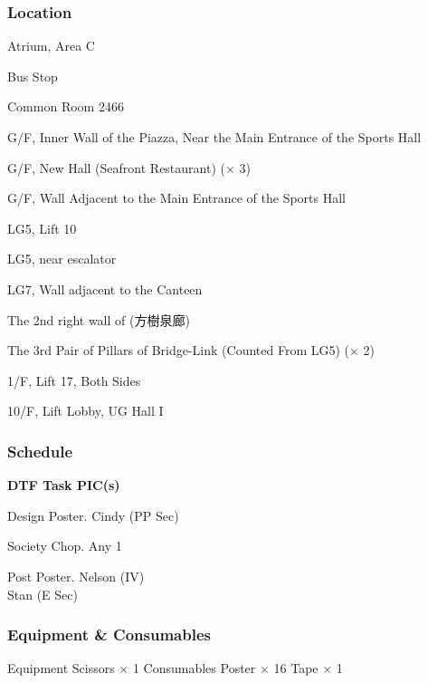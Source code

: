 \subsubsection{Location}
\startitemize
\item Atrium, Area C
\item Bus Stop
\item Common Room 2466
\item G/F, Inner Wall of the Piazza, Near the Main Entrance of the Sports Hall
\item G/F, New Hall (Seafront Restaurant) ($\times$ 3)
\item G/F, Wall Adjacent to the Main Entrance of the Sports Hall
\item LG5, Lift 10
\item LG5, near escalator
\item LG7, Wall adjacent to the Canteen
\item The 2nd right wall of  ({\switchtobodyfont[sourcehan]方樹泉廊})
\item The 3rd Pair of Pillars of Bridge-Link (Counted From LG5) ($\times$ 2)
\item 1/F, Lift 17, Both Sides
\item 10/F, Lift Lobby, UG Hall I
\stopitemize

\subsubsection{Schedule}

\setupTABLE[c][1][width=1.25in]
\setupTABLE[c][2][width=3.5in]
\setupTABLE[c][3][width=1.25in]
\bTABLE
\bTABLEhead

\bTR\bTH    \bf{DTF}
\eTH\bTH    \bf{Task}
\eTH\bTH    \bf{PIC(s)}
\eTH\eTR

\eTABLEhead
\bTABLEbody

\bTR{}
\eTD\bTD Design Poster.
\eTD\bTD Cindy (PP Sec)
\eTD\eTR

\bTR{}
\eTD\bTD Society Chop.
\eTD\bTD Any 1
\eTD\eTR

\bTR{}
\eTD\bTD Post Poster.
\eTD\bTD Nelson (IV) \\ Stan (E Sec)
\eTD\eTR

\eTABLEbody
\eTABLE

\subsubsection{Equipment \& Consumables}
\starttabulate[|l|l|]
\NC{}Equipment\NC\NR
\HL
\NC Scissors    \NC $\times$ 1  \NR
\HL
\NR
\NC{}Consumables\NC\NR
\HL
\NC Poster      \NC $\times$ 16 \NR
\NC Tape        \NC $\times$ 1  \NR
\HL
\stoptabulate

